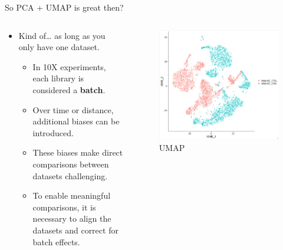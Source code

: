\begin{frame}[allowframebreaks]{So PCA + UMAP is great then?}
    \begin{columns}
    \begin{column}{0.4\textwidth}
        \begin{itemize}
            \item Kind of\ldots{} as long as you only have one dataset.
            \begin{itemize}
                \item In 10X experiments, each library is considered a \textbf{batch}.
                \item Over time or distance, additional biases can be introduced.
                \item These biases make direct comparisons between datasets challenging.
                \item To enable meaningful comparisons, it is necessary to align the datasets and correct for batch effects.
            \end{itemize}
        \end{itemize}
    \end{column}
    \begin{column}{0.6\textwidth}
        \begin{figure}
            \centering
            \includegraphics[width=1\textwidth,keepaspectratio]{images/dul/dim-reduce/slide_45_1_img.png}
            \caption{UMAP}
        \end{figure}
    \end{column}
    \end{columns}
\end{frame}